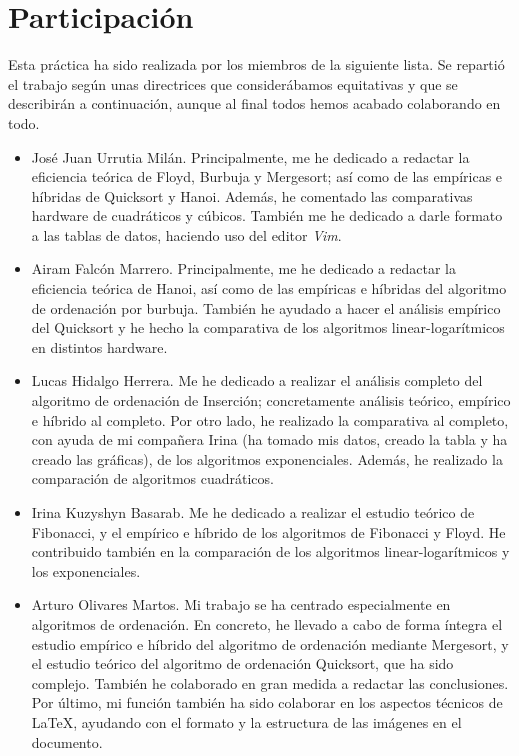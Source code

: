 \documentclass[12pt]{article}
\begin{document}
    \tableofcontents
    \newpage
    \fancyhead[R]{\helv \nouppercase{\rightmark}}


    \section{Participación}
    Esta práctica ha sido realizada por los miembros de la siguiente lista. Se repartió el trabajo según unas directrices que considerábamos equitativas y que se describirán a continuación, aunque al final todos hemos acabado colaborando en todo.
    \begin{itemize}
        \item José Juan Urrutia Milán. Principalmente, me he dedicado a redactar la eficiencia teórica de Floyd, Burbuja y Mergesort; así como de las empíricas e híbridas de Quicksort y Hanoi. Además, he comentado las comparativas hardware de cuadráticos y cúbicos.
        También me he dedicado a darle formato a las tablas de datos, haciendo uso del editor \emph{Vim}.
        \item Airam Falcón Marrero. Principalmente, me he dedicado a redactar la eficiencia teórica de Hanoi, así como de las empíricas e híbridas del algoritmo de ordenación por burbuja. También he ayudado a hacer el análisis empírico del Quicksort y he hecho la comparativa de los algoritmos linear-logarítmicos en distintos hardware.
        \item Lucas Hidalgo Herrera. Me he dedicado a realizar el análisis completo del algoritmo de ordenación de Inserción; concretamente análisis teórico, empírico e híbrido al completo. Por otro lado, he realizado la comparativa al completo, con ayuda de mi compañera Irina (ha tomado mis datos, creado la tabla y ha creado las gráficas), de los algoritmos exponenciales. Además, he realizado la comparación de algoritmos cuadráticos.
        \item Irina Kuzyshyn Basarab. Me he dedicado a realizar el estudio teórico de Fibonacci, y el empírico e híbrido de los algoritmos de Fibonacci y Floyd. He contribuido también en la comparación de los algoritmos linear-logarítmicos y los exponenciales. 
        \item Arturo Olivares Martos. Mi trabajo se ha centrado especialmente en algoritmos de ordenación. En concreto, he llevado a cabo de forma íntegra el estudio empírico e híbrido del algoritmo de ordenación mediante Mergesort, y el estudio teórico del algoritmo de ordenación Quicksort, que ha sido complejo. También he colaborado en gran medida a redactar las conclusiones. Por último, mi función también ha sido colaborar en los aspectos técnicos de \LaTeX, ayudando con el formato y la estructura de las imágenes en el documento.
    \end{itemize}
    
\end{document}
